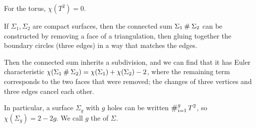 \begin{example}
	For the torus, $\chi(T^2) = 0$.
\end{example} 

\begin{example}
	If $\Sigma_1, \Sigma_2$ are compact surfaces, then the connected sum $\Sigma_1 \mathbin{\#} \Sigma_2$ can be constructed by removing a face of a triangulation, then gluing together the boundary circles (three edges) in a way that matches the edges.

	Then the connected sum inherits a subdivision, and we can find that it has Euler characteristic $\chi(\Sigma_1 \mathbin{\#} \Sigma_2) = \chi(\Sigma_1) + \chi(\Sigma_2) - 2$, where the remaining term corresponds to the two faces that were removed; the changes of three vertices and three edges cancel each other.

	In particular, a surface $\Sigma_g$ with $g$ holes can be written $\bigconnect_{i=1}^g T^2$, so $\chi(\Sigma_g) = 2 - 2g$.
	We call $g$ the  of $\Sigma$.
\end{example} 